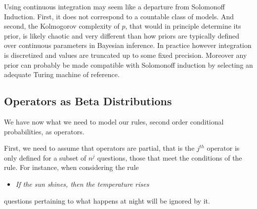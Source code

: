 \documentclass[runningheads]{llncs}
\begin{document}
Using continuous integration may seem like a departure from Solomonoff
Induction. First, it does not correspond to a countable class of
models. And second, the Kolmogorov complexity of $p$, that would in
principle determine its prior, is likely chaotic and very different
than how priors are typically defined over continuous parameters in
Bayesian inference. In practice however integration is discretized and
values are truncated up to some fixed precision. Moreover any prior
can probably be made compatible with Solomonoff induction by selecting
an adequate Turing machine of reference.
\subsection{Operators as Beta Distributions}
\label{beta-op}
We have now what we need to model our rules, second order conditional
probabilities, as operators.

First, we need to assume that operators are partial, that is the
$j^{th}$ operator is only defined for a subset of $n^j$ questions,
those that meet the conditions of the rule. For instance, when
considering the rule
\begin{itemize}
\item {\it If the sun shines, then the temperature rises}
\end{itemize}
questions pertaining to what happens at night will be ignored by it.
\end{document}
